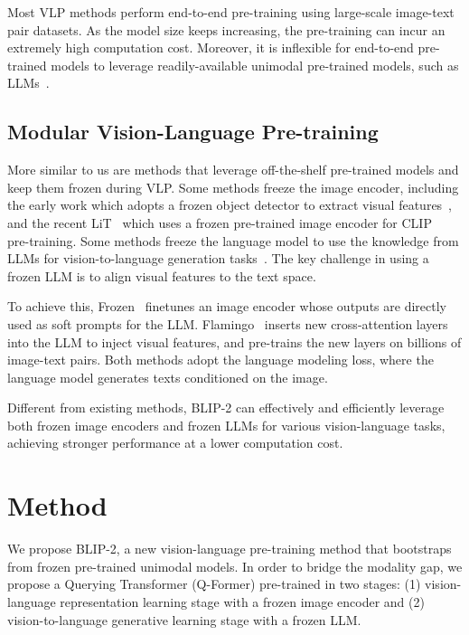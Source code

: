 Most VLP methods perform end-to-end pre-training using large-scale image-text pair datasets. As the model size keeps increasing, the pre-training can incur an extremely high computation cost. Moreover, it is inflexible for end-to-end pre-trained models to leverage readily-available unimodal pre-trained models, such as LLMs~\cite{gpt3,opt,flanT5}.

\subsection{Modular Vision-Language Pre-training}

More similar to us are methods that leverage off-the-shelf pre-trained models and keep them frozen during VLP. Some methods freeze the image encoder, including the early work which adopts a frozen object detector to extract visual features~\cite{uniter,oscar,vinvl}, and the recent LiT~\cite{LiT} which uses a frozen pre-trained image encoder for CLIP~\cite{clip} pre-training. Some methods freeze the language model to use the knowledge from LLMs for vision-to-language generation tasks~\cite{Frozen,flamingo,vgpt,mapl,pnp-vqa,img2prompt}. The key challenge in using a frozen LLM is to align visual features to the text space.

To achieve this, Frozen~\cite{Frozen} finetunes an image encoder whose outputs are directly used as soft prompts for the LLM. Flamingo~\cite{flamingo} inserts new cross-attention layers into the LLM to inject visual features, and pre-trains the new layers on billions of image-text pairs. Both methods adopt the language modeling loss, where the language model generates texts conditioned on the image.

Different from existing methods, BLIP-2 can effectively and efficiently leverage both frozen image encoders and frozen LLMs for various vision-language tasks, achieving stronger performance at a lower computation cost.

\section{Method}
\label{sec:method}

We propose BLIP-2, a new vision-language pre-training method that bootstraps from frozen pre-trained unimodal models. In order to bridge the modality gap, we propose a Querying Transformer (Q-Former) pre-trained in two stages: (1) vision-language representation learning stage with a frozen image encoder and (2) vision-to-language generative learning stage with a frozen LLM.

